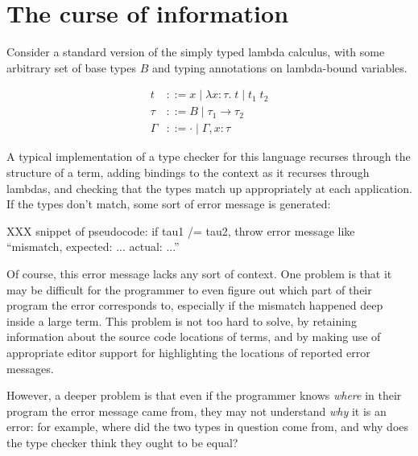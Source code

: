 \documentclass[sigplan, screen]{acmart}\settopmatter{printccs=false,printacmref=false}
\begin{document}
\section{The curse of information}

Consider a standard version of the simply typed lambda calculus, with
some arbitrary set of base types $B$ and typing annotations on
lambda-bound variables.

\newcommand{\lam}[3]{\lambda {#1}\!:\!{#2}.\; {#3}}
\newcommand{\app}[2]{{#1}\; {#2}}

\newcommand{\ty}[3]{{#1} \vdash {#2} : {#3}}

\begin{align*}
  t &::= x \mid \lam x \tau t \mid \app{t_1}{t_2} \\
  \tau &::= B \mid \tau_1 \to \tau_2 \\
  \Gamma &::= \cdot \mid \Gamma,x:\tau
\end{align*}


A typical implementation of a type checker for this language recurses
through the structure of a term, adding bindings to the context as it
recurses through lambdas, and checking that the types match up
appropriately at each application.  If the types don't match, some
sort of error message is generated:

XXX snippet of pseudocode: if tau1 /= tau2, throw error message
like ``mismatch, expected: ... actual: ...''

Of course, this error message lacks any sort of context.  One problem
is that it may be difficult for the programmer to even figure out
which part of their program the error corresponds to, especially if
the mismatch happened deep inside a large term. This problem is not
too hard to solve, by retaining information about the source code
locations of terms, and by making use of appropriate editor support for
highlighting the locations of reported error messages.

However, a deeper problem is that even if the programmer knows
\emph{where} in their program the error message came from, they may
not understand \emph{why} it is an error: for example, where
did the two types in question come from, and why does the type checker
think they ought to be equal?
\end{document}
